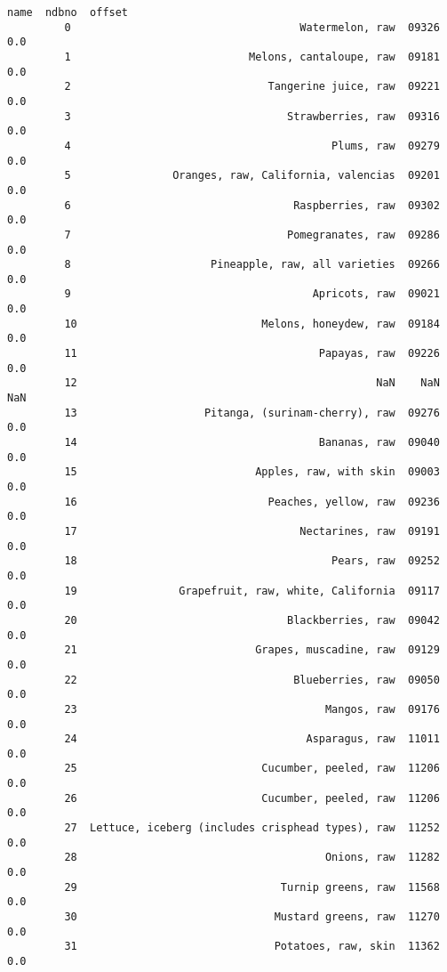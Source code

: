 \documentclass[11pt]{article}
\begin{document}
\begin{Verbatim}[commandchars=\\\{\}]
                                                         name  ndbno  offset  
         0                                    Watermelon, raw  09326     0.0  
         1                            Melons, cantaloupe, raw  09181     0.0  
         2                               Tangerine juice, raw  09221     0.0  
         3                                  Strawberries, raw  09316     0.0  
         4                                         Plums, raw  09279     0.0  
         5                Oranges, raw, California, valencias  09201     0.0  
         6                                   Raspberries, raw  09302     0.0  
         7                                  Pomegranates, raw  09286     0.0  
         8                      Pineapple, raw, all varieties  09266     0.0  
         9                                      Apricots, raw  09021     0.0  
         10                             Melons, honeydew, raw  09184     0.0  
         11                                      Papayas, raw  09226     0.0  
         12                                               NaN    NaN     NaN  
         13                    Pitanga, (surinam-cherry), raw  09276     0.0  
         14                                      Bananas, raw  09040     0.0  
         15                            Apples, raw, with skin  09003     0.0  
         16                              Peaches, yellow, raw  09236     0.0  
         17                                   Nectarines, raw  09191     0.0  
         18                                        Pears, raw  09252     0.0  
         19                Grapefruit, raw, white, California  09117     0.0  
         20                                 Blackberries, raw  09042     0.0  
         21                            Grapes, muscadine, raw  09129     0.0  
         22                                  Blueberries, raw  09050     0.0  
         23                                       Mangos, raw  09176     0.0  
         24                                    Asparagus, raw  11011     0.0  
         25                             Cucumber, peeled, raw  11206     0.0  
         26                             Cucumber, peeled, raw  11206     0.0  
         27  Lettuce, iceberg (includes crisphead types), raw  11252     0.0  
         28                                       Onions, raw  11282     0.0  
         29                                Turnip greens, raw  11568     0.0  
         30                               Mustard greens, raw  11270     0.0  
         31                               Potatoes, raw, skin  11362     0.0  

\end{Verbatim}
\end{document}

